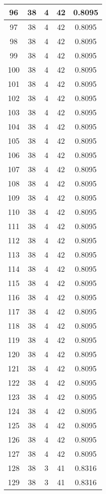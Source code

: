 \documentclass[letterpaper, 12pt]{article}
\begin{document}
\begin{longtable}{|c|c|c|c|c|}
\hline
96 & 38 & 4 & 42 & 0.8095 \\
\hline
97 & 38 & 4 & 42 & 0.8095 \\
\hline
98 & 38 & 4 & 42 & 0.8095 \\
\hline
99 & 38 & 4 & 42 & 0.8095 \\
\hline
100 & 38 & 4 & 42 & 0.8095 \\
\hline
101 & 38 & 4 & 42 & 0.8095 \\
\hline
102 & 38 & 4 & 42 & 0.8095 \\
\hline
103 & 38 & 4 & 42 & 0.8095 \\
\hline
104 & 38 & 4 & 42 & 0.8095 \\
\hline
105 & 38 & 4 & 42 & 0.8095 \\
\hline
106 & 38 & 4 & 42 & 0.8095 \\
\hline
107 & 38 & 4 & 42 & 0.8095 \\
\hline
108 & 38 & 4 & 42 & 0.8095 \\
\hline
109 & 38 & 4 & 42 & 0.8095 \\
\hline
110 & 38 & 4 & 42 & 0.8095 \\
\hline
111 & 38 & 4 & 42 & 0.8095 \\
\hline
112 & 38 & 4 & 42 & 0.8095 \\
\hline
113 & 38 & 4 & 42 & 0.8095 \\
\hline
114 & 38 & 4 & 42 & 0.8095 \\
\hline
115 & 38 & 4 & 42 & 0.8095 \\
\hline
116 & 38 & 4 & 42 & 0.8095 \\
\hline
117 & 38 & 4 & 42 & 0.8095 \\
\hline
118 & 38 & 4 & 42 & 0.8095 \\
\hline
119 & 38 & 4 & 42 & 0.8095 \\
\hline
120 & 38 & 4 & 42 & 0.8095 \\
\hline
121 & 38 & 4 & 42 & 0.8095 \\
\hline
122 & 38 & 4 & 42 & 0.8095 \\
\hline
123 & 38 & 4 & 42 & 0.8095 \\
\hline
124 & 38 & 4 & 42 & 0.8095 \\
\hline
125 & 38 & 4 & 42 & 0.8095 \\
\hline
126 & 38 & 4 & 42 & 0.8095 \\
\hline
127 & 38 & 4 & 42 & 0.8095 \\
\hline
128 & 38 & 3 & 41 & 0.8316 \\
\hline
129 & 38 & 3 & 41 & 0.8316 \\

\end{longtable}
\end{document}

